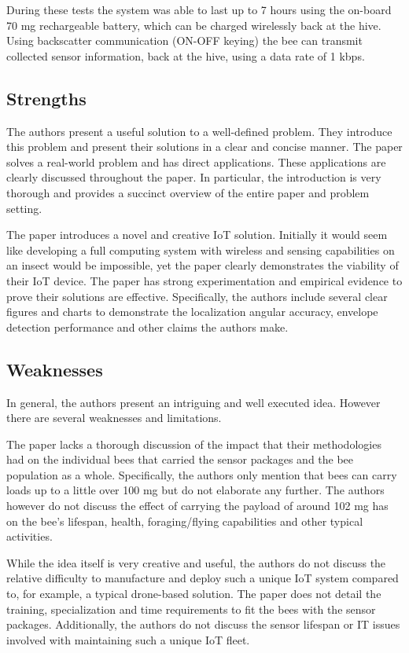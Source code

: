 \documentclass[letterpaper,twocolumn,10pt]{article}
\begin{document}
During these tests the system was able to last up to 7 hours using the on-board 70 mg rechargeable battery, which can be charged wirelessly back at the hive. Using backscatter communication (ON-OFF keying) the bee can transmit collected sensor information, back at the hive, using a data rate of 1 kbps. 

\subsection*{Strengths}

The authors present a useful solution to a well-defined problem. They introduce this problem and present their solutions in a clear and concise manner. The paper solves a real-world problem and has direct applications. These applications are clearly discussed throughout the paper. In particular, the introduction is very thorough and provides a succinct overview of the entire paper and problem setting.

The paper introduces a novel and creative IoT solution. Initially it would seem like developing a full computing system with wireless and sensing capabilities on an insect would be impossible, yet the paper clearly demonstrates the viability of their IoT device. The paper has strong experimentation and empirical evidence to prove their solutions are effective. Specifically, the authors include several clear figures and charts to demonstrate the localization angular accuracy, envelope detection performance and other claims the authors make.

\subsection*{Weaknesses}

In general, the authors present an intriguing and well executed idea. However there are several weaknesses and limitations.

The paper lacks a thorough discussion of the impact that their methodologies had on the individual bees that carried the sensor packages and the bee population as a whole. Specifically, the authors only mention that bees can carry loads up to a little over 100 mg but do not elaborate any further. The authors however do not discuss the effect of carrying the payload of around 102 mg has on the bee's lifespan, health, foraging/flying capabilities and other typical activities.

While the idea itself is very creative and useful, the authors do not discuss the relative difficulty to manufacture and deploy such a unique IoT system compared to, for example, a typical drone-based solution. The paper does not detail the training, specialization and time requirements to fit the bees with the sensor packages. Additionally, the authors do not discuss the sensor lifespan or IT issues involved with maintaining such a unique IoT fleet.
\end{document}
